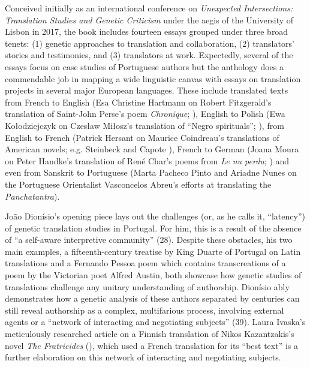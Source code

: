 \documentclass{article}
\begin{document}
Conceived initially as an international conference on \emph{Unexpected
Intersections: Translation Studies and Genetic Criticism} under the
aegis of the University of Lisbon in 2017, the book includes fourteen
essays grouped under three broad tenets: (1) genetic approaches to
translation and collaboration, (2) translators' stories and testimonies,
and (3) translators at work. Expectedly, several of the essays focus on
case studies of Portuguese authors but the anthology does a commendable
job in mapping a wide linguistic canvas with essays on translation
projects in several major European languages. These include translated
texts from French to English (Esa Christine Hartmann on Robert
Fitzgerald's translation of Saint-John Perse's poem \emph{Chronique};
\citeyear{perse_chronique_1961}), English to Polish (Ewa Kołodziejczyk on Czesław Miłosz's
translation of ``Negro spirituals''; \cite{Miłosz_negro_1948,Miłosz_wiersze_1948}), from English to French
(Patrick Hersant on Maurice Coindreau's translations of American novels;
e.g. Steinbeck \citeyear{steinbeck_souris_1939} and Capote \citeyear{capote_harpe_1952}), French to German (Joana Moura on
Peter Handke's translation of René Char's poems from \emph{Le nu perdu};
) and even from Sanskrit to Portuguese (Marta Pacheco Pinto and
Ariadne Nunes on the Portuguese Orientalist Vasconcelos Abreu's efforts
at translating the \emph{Panchatantra}).

João Dionísio's opening piece lays out the challenges (or, as he calls
it, ``latency'') of genetic translation studies in Portugal. For him,
this is a result of the absence of ``a self-aware interpretive
community'' (28). Despite these obstacles, his two main examples, a
fifteenth-century treatise by King Duarte of Portugal on Latin
translations and a Fernando Pessoa poem which contains transcreations of
a poem by the Victorian poet Alfred Austin, both showcase how genetic
studies of translations challenge any unitary understanding of
authorship. Dionísio ably demonstrates how a genetic analysis of these
authors separated by centuries can still reveal authorship as a complex,
multifarious process, involving external agents or a ``network of
interacting and negotiating subjects'' (39). Laura Ivaska's meticulously
researched article on a Finnish translation of Nikos Kazantzakis's novel
\emph{The Fratricides} (\citeyear{kazantzakis_veljesviha_1967}), which used a French translation for its
``best text'' is a further elaboration on this network of interacting
and negotiating subjects.
\end{document}
